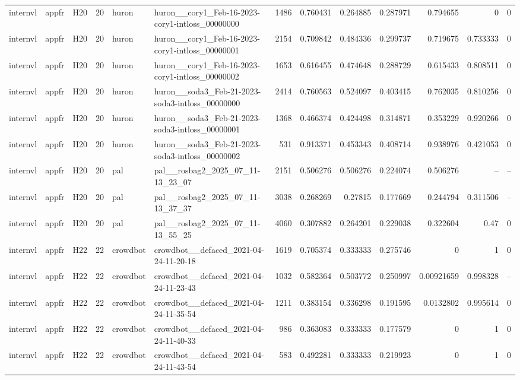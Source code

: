 \begin{longtable}{lllrllrrrrrrr}
internvl & appfr & H20 & 20 & huron & huron\_\_cory1\_Feb-16-2023-cory1-intloss\_00000000 & 1486 & 0.760431 & 0.264885 & 0.287971 & 0.794655 & 0 & 0 \\
internvl & appfr & H20 & 20 & huron & huron\_\_cory1\_Feb-16-2023-cory1-intloss\_00000001 & 2154 & 0.709842 & 0.484336 & 0.299737 & 0.719675 & 0.733333 & 0 \\
internvl & appfr & H20 & 20 & huron & huron\_\_cory1\_Feb-16-2023-cory1-intloss\_00000002 & 1653 & 0.616455 & 0.474648 & 0.288729 & 0.615433 & 0.808511 & 0 \\
internvl & appfr & H20 & 20 & huron & huron\_\_soda3\_Feb-21-2023-soda3-intloss\_00000000 & 2414 & 0.760563 & 0.524097 & 0.403415 & 0.762035 & 0.810256 & 0 \\
internvl & appfr & H20 & 20 & huron & huron\_\_soda3\_Feb-21-2023-soda3-intloss\_00000001 & 1368 & 0.466374 & 0.424498 & 0.314871 & 0.353229 & 0.920266 & 0 \\
internvl & appfr & H20 & 20 & huron & huron\_\_soda3\_Feb-21-2023-soda3-intloss\_00000002 & 531 & 0.913371 & 0.453343 & 0.408714 & 0.938976 & 0.421053 & 0 \\
internvl & appfr & H20 & 20 & pal & pal\_\_rosbag2\_2025\_07\_11-13\_23\_07 & 2151 & 0.506276 & 0.506276 & 0.224074 & 0.506276 & -- & -- \\
internvl & appfr & H20 & 20 & pal & pal\_\_rosbag2\_2025\_07\_11-13\_37\_37 & 3038 & 0.268269 & 0.27815 & 0.177669 & 0.244794 & 0.311506 & -- \\
internvl & appfr & H20 & 20 & pal & pal\_\_rosbag2\_2025\_07\_11-13\_55\_25 & 4060 & 0.307882 & 0.264201 & 0.229038 & 0.322604 & 0.47 & 0 \\
internvl & appfr & H22 & 22 & crowdbot & crowdbot\_\_defaced\_2021-04-24-11-20-18 & 1619 & 0.705374 & 0.333333 & 0.275746 & 0 & 1 & 0 \\
internvl & appfr & H22 & 22 & crowdbot & crowdbot\_\_defaced\_2021-04-24-11-23-43 & 1032 & 0.582364 & 0.503772 & 0.250997 & 0.00921659 & 0.998328 & -- \\
internvl & appfr & H22 & 22 & crowdbot & crowdbot\_\_defaced\_2021-04-24-11-35-54 & 1211 & 0.383154 & 0.336298 & 0.191595 & 0.0132802 & 0.995614 & 0 \\
internvl & appfr & H22 & 22 & crowdbot & crowdbot\_\_defaced\_2021-04-24-11-40-33 & 986 & 0.363083 & 0.333333 & 0.177579 & 0 & 1 & 0 \\
internvl & appfr & H22 & 22 & crowdbot & crowdbot\_\_defaced\_2021-04-24-11-43-54 & 583 & 0.492281 & 0.333333 & 0.219923 & 0 & 1 & 0 \\

\end{longtable}

